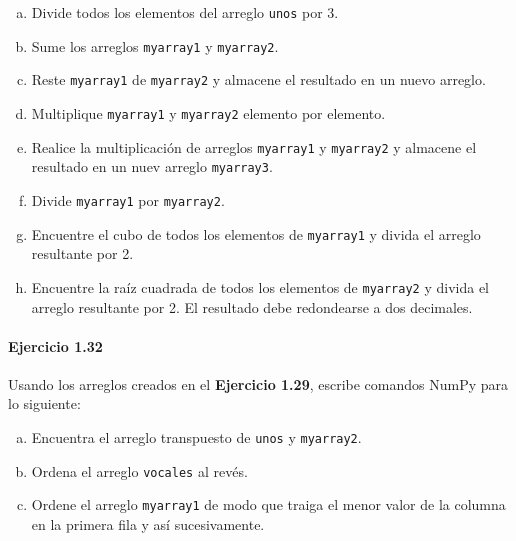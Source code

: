 \begin{enumerate}[(a)]
	\item

	      Divide todos los elementos del arreglo
	      \texttt{unos} por 3.

	\item

	      Sume los arreglos \texttt{myarray1} y
	      \texttt{myarray2}.

	\item

	      Reste \texttt{myarray1} de
	      \texttt{myarray2} y almacene el resultado en un
	      nuevo arreglo.

	\item

	      Multiplique \texttt{myarray1} y
	      \texttt{myarray2} elemento por elemento.

	\item

	      Realice la multiplicación de arreglos
	      \texttt{myarray1} y \texttt{myarray2}
	      y almacene el resultado en un nuev arreglo
	      \texttt{myarray3}.

	\item

	      Divide \texttt{myarray1} por
	      \texttt{myarray2}.

	\item

	      Encuentre el cubo de todos los elementos de
	      \texttt{myarray1} y divida el arreglo resultante
	      por 2.

	\item

	      Encuentre la raíz cuadrada de todos los elementos de
	      \texttt{myarray2} y divida el arreglo resultante
	      por 2.
	      El resultado debe redondearse a dos decimales.
\end{enumerate}

\paragraph{\color{DarkBlue}Ejercicio 1.32}
Usando los arreglos creados en el \textbf{Ejercicio 1.29},
escribe comandos NumPy para lo siguiente:

\begin{enumerate}[(a)]
	\item

	      Encuentra el arreglo transpuesto de \texttt{unos}
	      y \texttt{myarray2}.

	\item

	      Ordena el arreglo \texttt{vocales} al revés.

	\item

	      Ordene el arreglo \texttt{myarray1} de modo que
	      traiga el menor valor de la columna en la primera fila y así
	      sucesivamente.
\end{enumerate}

